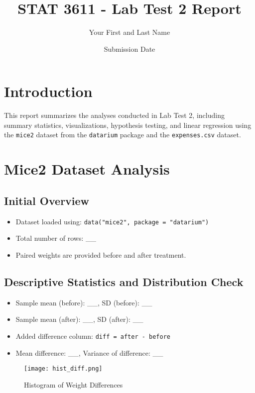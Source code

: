 \documentclass{article}
\title{STAT 3611 - Lab Test 2 Report}
\author{Your First and Last Name}
\date{Submission Date}
\begin{document}
\maketitle

\section{Introduction}
This report summarizes the analyses conducted in Lab Test 2, including summary statistics, visualizations, hypothesis testing, and linear regression using the \texttt{mice2} dataset from the \texttt{datarium} package and the \texttt{expenses.csv} dataset.

\section{Mice2 Dataset Analysis}

\subsection{Initial Overview}
\begin{itemize}
    \item Dataset loaded using: \texttt{data("mice2", package = "datarium")}
    \item Total number of rows: \_\_
    \item Paired weights are provided before and after treatment.
\end{itemize}

\subsection{Descriptive Statistics and Distribution Check}
\begin{itemize}
    \item Sample mean (before): \_\_, SD (before): \_\_
    \item Sample mean (after): \_\_, SD (after): \_\_
    \item Added difference column: \texttt{diff = after - before}
    \item Mean difference: \_\_, Variance of difference: \_\_
\end{itemize}

\begin{figure}[H]
    \centering
    \texttt{[image: hist\_diff.png]} %
    \caption{Histogram of Weight Differences}
\end{figure}
\end{document}

